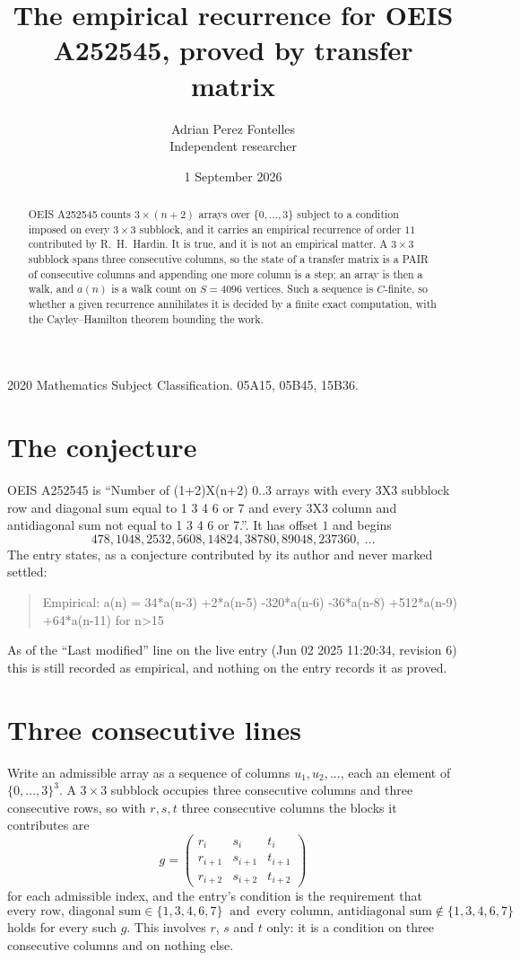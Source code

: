\documentclass[11pt,a4paper]{article}
\title{The empirical recurrence for OEIS A252545, proved by transfer matrix}
\author{Adrian Perez Fontelles\\ \small Independent researcher}
\date{1 September 2026}
\theoremstyle{plain}
\theoremstyle{definition}
\begin{document}
\maketitle

\begin{abstract}
OEIS A252545 counts $3\times(n+2)$ arrays over $\{0,\dots,3\}$ subject to a condition imposed on
every $3\times3$ subblock, and it carries an empirical recurrence of order $11$
contributed by R.~H.~Hardin. It is true, and it is not an empirical matter. A $3\times3$
subblock spans three consecutive columns, so the state of a transfer matrix is a PAIR of
consecutive columns and appending one more column is a step; an array is then a walk, and
$a(n)$ is a walk count on $S=4096$ vertices. Such a sequence is $C$-finite, so whether a given
recurrence annihilates it is decided by a finite exact computation, with the Cayley--Hamilton
theorem bounding the work.
\end{abstract}

\noindent\small 2020 Mathematics Subject Classification. 05A15, 05B45, 15B36.\normalsize

\section{The conjecture}

OEIS A252545 is ``Number of (1+2)X(n+2) 0..3 arrays with every 3X3 subblock row and diagonal sum equal to 1 3 4 6 or 7 and every 3X3 column and antidiagonal sum not equal to 1 3 4 6 or 7.''. It has offset $1$ and begins
\[
478, 1048, 2532, 5608, 14824, 38780, 89048, 237360,\ \dots
\]
The entry states, as a conjecture contributed by its author and never marked settled:
\begin{quote}
Empirical: a(n) = 34*a(n-3) +2*a(n-5) -320*a(n-6) -36*a(n-8) +512*a(n-9) +64*a(n-11) for n>15
\end{quote}
As of the ``Last modified'' line on the live entry (Jun 02 2025 11:20:34, revision 6) this is still
recorded as empirical, and nothing on the entry records it as proved.

\section{Three consecutive lines}

Write an admissible array as a sequence of columns $u_1,u_2,\dots$, each an element of
$\{0,\dots,3\}^{3}$. A $3\times3$ subblock occupies three consecutive columns and
three consecutive rows, so with $r,s,t$ three consecutive columns the blocks it
contributes are
\[
g=\begin{pmatrix}r_i&s_i&t_i\\ r_{i+1}&s_{i+1}&t_{i+1}\\ r_{i+2}&s_{i+2}&t_{i+2}\end{pmatrix}
\]
for each admissible index, and the entry's condition is the requirement that
\[
\text{every row, diagonal sum} \in \{1,3,4,6,7\}\ \text{ and }\ \text{every column, antidiagonal sum} \notin \{1,3,4,6,7\}
\]
holds for every such $g$. This involves $r$, $s$ and $t$ only: it is a condition on
three consecutive columns and on nothing else.
\end{document}
